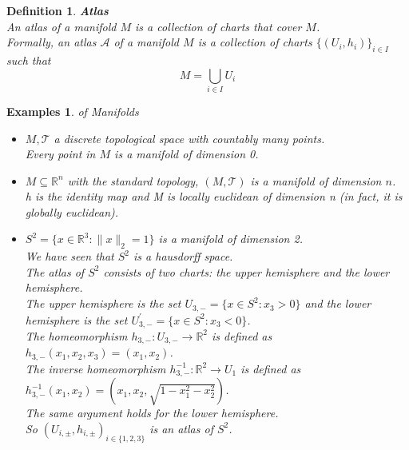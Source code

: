 \documentclass[11pt]{book} %
\newtheorem{definition}{Definition}[section]
\newtheorem*{examples*}{Examples}
\begin{document}
\begin{definition}{\textbf{Atlas}} \\
    An atlas of a manifold \( M \) is a collection of charts that cover \( M \). \\
    Formally, an atlas \( \mathcal{A} \) of a manifold \( M \) is a collection of charts \( \{ (U_i, h_i) \}_{i \in I} \) such that 
    \begin{equation*}
        M = \bigcup_{i \in I} U_i
    \end{equation*}
\end{definition}

\begin{examples*} of Manifolds
    \begin{itemize}
        \item \( M , \mathcal{T} \) a discrete topological space with countably many points. \\
            Every point in \( M \) is a manifold of dimension 0.

        \item \( M \subseteq \mathbb{R}^n \) with the standard topology, \( (M , \mathcal{T}) \) is a manifold of dimension \( n \). \\
            h is the identity map and M is locally euclidean of dimension n (in fact, it is globally euclidean).

        \item \( S^2 = \{ x \in \mathbb{R}^3 : \| x \|_2 = 1 \} \) is a manifold of dimension 2. \\
            We have seen that \( S^2 \) is a hausdorff space. \\ 
            The atlas of \( S^2 \) consists of two charts: the upper hemisphere and the lower hemisphere. \\
            The upper hemisphere is the set \( U_{3, -} = \{ x \in S^2 : x_3 > 0 \} \) and the lower hemisphere is the set \( U_{3, -}^{'}= \{ x \in S^2 : x_3 < 0 \} \). \\
            The homeomorphism \( h_{3, -}: U_{3, -} \to \mathbb{R}^2 \) is defined as \( h_{3, -}(x_1, x_2, x_3) = (x_1, x_2) \). \\
            The inverse homeomorphism \( h_{3, -}^{-1}: \mathbb{R}^2 \to U_1 \) is defined as \( h_{3, -}^{-1}(x_1, x_2) = (x_1, x_2, \sqrt{1 - x_1^2 - x_2^2}) \). \\
            The same argument holds for the lower hemisphere. \\
            So \( (U_{i, \pm }, h_{i, \pm})_{i \in \{1,2,3\}} \) is an atlas of \( S^2 \).
    \end{itemize}
    
\end{examples*}
\end{document}
